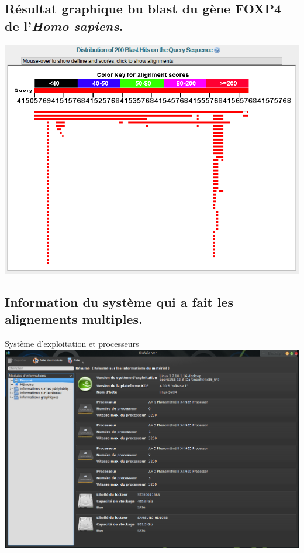 \documentclass[10.9pt]{article} %
\begin{document}
\subsection{Résultat graphique bu blast du gène FOXP4 de l'\emph{Homo sapiens}.}\label{15}
\includegraphics{annexes/question_4/FOXP4_megablast_result.png}

\subsection{Information du système qui a fait les alignements multiples.}\label{16}

Système d'exploitation et processeurs\\
\includegraphics[width=\linewidth]{annexes/question_4/systeme_1.png}
\end{document}
